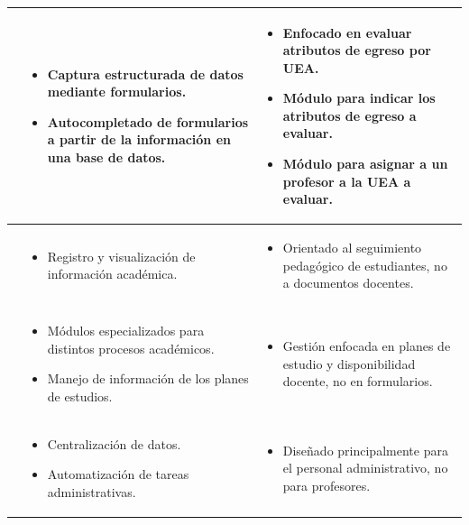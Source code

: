 \begin{longtable}{p{} p{} p{}}
\cite{Cuautle2022} &
    \begin{itemize}[topsep=0pt,itemsep=0pt,parsep=0pt,partopsep=0pt]
        \item Captura estructurada de datos mediante formularios.
        \item Autocompletado de formularios a partir de la información en una base de datos.
    \end{itemize} &
    \begin{itemize}[topsep=0pt,itemsep=0pt,parsep=0pt,partopsep=0pt]
        \item Enfocado en evaluar atributos de egreso por UEA.
        \item Módulo para indicar los atributos de egreso a evaluar.
        \item Módulo para asignar a un profesor a la UEA a evaluar.
    \end{itemize} \\
\midrule

\cite{callisaya2024sistema} &
\begin{itemize}[topsep=0pt,itemsep=0pt,parsep=0pt,partopsep=0pt]
        \item Registro y visualización de información académica.
\end{itemize} &
\begin{itemize}[topsep=0pt,itemsep=0pt,parsep=0pt,partopsep=0pt]
        \item Orientado al seguimiento pedagógico de estudiantes, no a documentos docentes.
\end{itemize} \\
\midrule

\cite{Rojas2019} &
\begin{itemize}[topsep=0pt,itemsep=0pt,parsep=0pt,partopsep=0pt]
    \item Módulos especializados para distintos procesos académicos.
    \item Manejo de  información  de los planes de estudios.
\end{itemize} &
\begin{itemize}[topsep=0pt,itemsep=0pt,parsep=0pt,partopsep=0pt]
	\item Gestión enfocada en planes de estudio y disponibilidad docente, no en formularios.
\end{itemize} \\
\midrule

\cite{gonzalez2017sistema} &
\begin{itemize}[topsep=0pt,itemsep=0pt,parsep=0pt,partopsep=0pt]
	\item Centralización de datos. 
	\item Automatización de tareas administrativas.
\end{itemize} &
\begin{itemize}[topsep=0pt,itemsep=0pt,parsep=0pt,partopsep=0pt]
	\item Diseñado principalmente para el personal administrativo, no para profesores.
\end{itemize} \\
    \bottomrule
\end{longtable}

